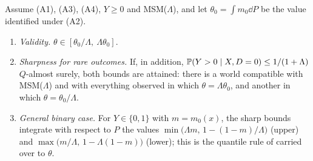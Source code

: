 \begin{proposition}\label{prop:sensitivity}
Assume (A1), (A3), (A4), $Y\ge0$ and MSM($\Lambda$), and let $\theta_0=\int m_0\dd P$ be the value identified under (A2).
\begin{enumerate}
  \item \emph{Validity.} $\theta\in[\theta_0/\Lambda,\ \Lambda\theta_0]$.
  \item \emph{Sharpness for rare outcomes.} If, in addition, $\mathbb{P}(Y>0\mid X,D=0)\le1/(1+\Lambda)$ $Q$-almost surely, both bounds are attained: there is a world compatible with MSM($\Lambda$) and with everything observed in which $\theta=\Lambda\theta_0$, and another in which $\theta=\theta_0/\Lambda$.
  \item \emph{General binary case.} For $Y\in\{0,1\}$ with $m=m_0(x)$, the sharp bounds integrate with respect to $P$ the values $\min\bigl(\Lambda m,\,1-(1-m)/\Lambda\bigr)$ (upper) and $\max\bigl(m/\Lambda,\,1-\Lambda(1-m)\bigr)$ (lower); this is the quantile rule of \citet{dorn2023} carried over to $\theta$.
\end{enumerate}
\end{proposition}
